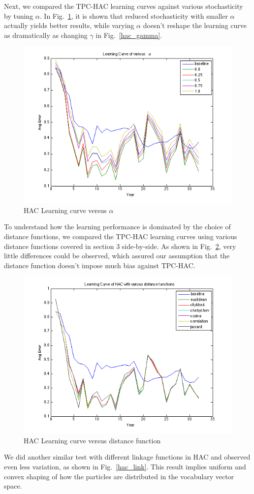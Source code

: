\documentclass[conference]{IEEEtran}
\begin{document}
Next, we compared the TPC-HAC learning curves against various stochasticity by tuning $\alpha$. In Fig.~\ref{hac_alpha}, it is shown that reduced stochasticity with smaller $\alpha$ actually yields better results, while varying $\alpha$ doesn't reshape the learning curve as dramatically as changing $\gamma$ in Fig.~\ref{hac_gamma}.

\begin{figure}[h]
	\center
	\includegraphics[width=.50\textwidth]{fig/hac_alpha.png}
	\caption{HAC Learning curve versus $\alpha$}
	\label{hac_alpha}
\end{figure}

To understand how the learning performance is dominated by the choice of distance functions, we compared the TPC-HAC learning curves using various distance functions covered in section 3 side-by-side. As shown in Fig.~\ref{hac_dist}, very little differences could be observed, which assured our assumption that the distance function doesn't impose much bias against TPC-HAC.

\begin{figure}[h]
	\center
	\includegraphics[width=.50\textwidth]{fig/hac_dist.png}
	\caption{HAC Learning curve versus distance function}
	\label{hac_dist}
\end{figure}

We did another similar test with different linkage functions in HAC and observed even less variation, as shown in Fig.~\ref{hac_link}. This result implies uniform and convex shaping of how the particles are distributed in the vocabulary vector space.
\end{document}
